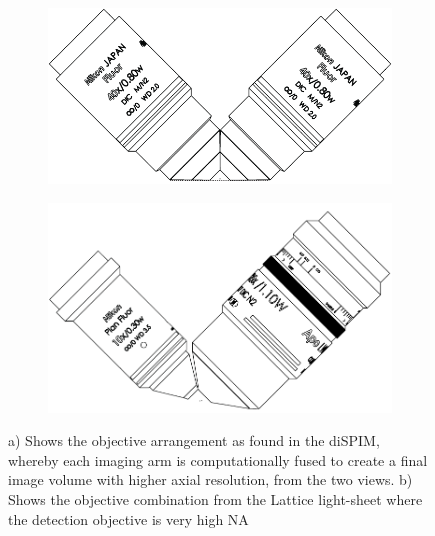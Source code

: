 \begin{figure}
    \centering
    \begin{subfigure}[b]{0.45\linewidth}
    \centering
    \includegraphics[width=0.9\linewidth]{./matched_objectives}
    \caption{}
    \end{subfigure}
    \begin{subfigure}[b]{0.45\linewidth}
        \centering
        \includegraphics[width=0.9\linewidth]{./assymetric_nikon}
        \caption{}
    \end{subfigure}
    \caption{
    a) Shows the objective arrangement as found in the diSPIM, whereby each imaging arm is computationally fused to create a final image volume with higher axial resolution, from the two views.
    b) Shows the objective combination from the Lattice light-sheet where the detection objective is very high NA
    }
    \label{}
\end{figure}

